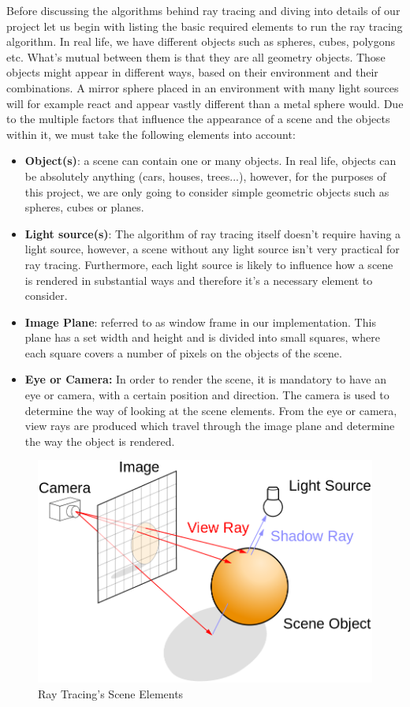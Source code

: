\documentclass[a4paper]{report}
\begin{document}
	Before discussing the algorithms behind ray tracing and diving into details of our project let us begin with listing the basic required elements to run the ray tracing algorithm. In real life, we have different objects such as spheres, cubes, polygons etc. What's mutual between them is that they are all geometry objects. Those objects might appear in different ways, based on their environment and their combinations. A mirror sphere placed in an environment with many light sources will for example react and appear vastly different than a metal sphere would. Due to the multiple factors that influence  the appearance of a scene and the objects within it, we must take the following elements into account:   
	\begin{itemize}
		\item \textbf{Object(s)}: a scene can contain one or many objects. In real life, objects can be absolutely anything (cars, houses, trees...), however, for the purposes of this project, we are only going to consider simple geometric objects such as spheres, cubes or planes.
		\item \textbf{Light source(s)}: The algorithm of ray tracing itself doesn't require having a light source, however, a scene without any light source isn't very practical for ray tracing. Furthermore, each light source is likely to influence how a scene is rendered in substantial ways and therefore it's a necessary element to consider.
		\item \textbf{Image Plane}: referred to as window frame in our implementation. This plane has a set width and height and is divided into small squares, where each square covers a number of pixels on the objects of the scene.
		\item \textbf{Eye or Camera:} In order to render the scene, it is mandatory to have an eye or camera, with a certain position and direction. The camera is used to determine the way of looking at the scene elements. From the eye or camera, view rays are produced which travel through the image plane and determine the way the object is rendered.
		
	\end{itemize}
	\begin{figure}[ht!]
		\centering
		\includegraphics[scale=0.2]{./raytracing.png}
		\caption{Ray Tracing's Scene Elements \cite{scratchapixel_overview_2014}}
		\label{fig:raytracing}
	\end{figure}
\end{document}
